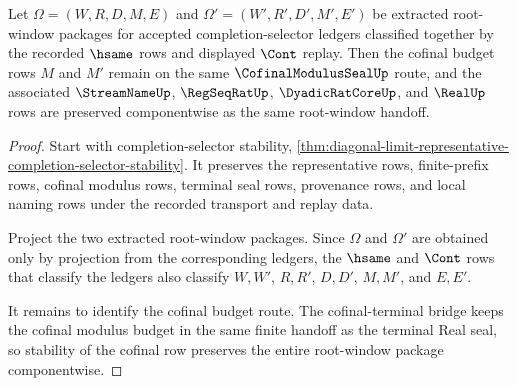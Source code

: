 \begin{theorem}
\label{thm:diagonal-limit-representative-cofinal-budget-stability}
Let $\Omega=(W,R,D,M,E)$ and $\Omega'=(W',R',D',M',E')$ be extracted root-window packages for accepted completion-selector ledgers classified together by the recorded $\hsame$ rows and displayed $\Cont$ replay. Then the cofinal budget rows $M$ and $M'$ remain on the same $\CofinalModulusSealUp$ route, and the associated $\StreamNameUp$, $\RegSeqRatUp$, $\DyadicRatCoreUp$, and $\RealUp$ rows are preserved componentwise as the same root-window handoff.
\end{theorem}
\begin{proof}
Start with completion-selector stability, \autoref{thm:diagonal-limit-representative-completion-selector-stability}. It preserves the representative rows, finite-prefix rows, cofinal modulus rows, terminal seal rows, provenance rows, and local naming rows under the recorded transport and replay data.

Project the two extracted root-window packages. Since $\Omega$ and $\Omega'$ are obtained only by projection from the corresponding ledgers, the $\hsame$ and $\Cont$ rows that classify the ledgers also classify $W,W'$, $R,R'$, $D,D'$, $M,M'$, and $E,E'$.

It remains to identify the cofinal budget route. The cofinal-terminal bridge keeps the cofinal modulus budget in the same finite handoff as the terminal Real seal, so stability of the cofinal row preserves the entire root-window package componentwise.
\end{proof}

